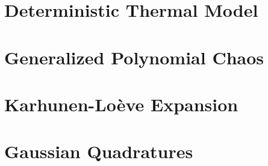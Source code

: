 \renewcommand{\thesection}{S\arabic{section}}
\renewcommand{\thetable}{S\arabic{table}}
\renewcommand{\thefigure}{S\arabic{figure}}
\setcounter{table}{0}
\setcounter{figure}{0}

\section{Deterministic Thermal Model} 


\section{Generalized Polynomial Chaos}   


\balance

\section{Karhunen-Lo\`{e}ve Expansion} 


\section{Gaussian Quadratures} 


% 
